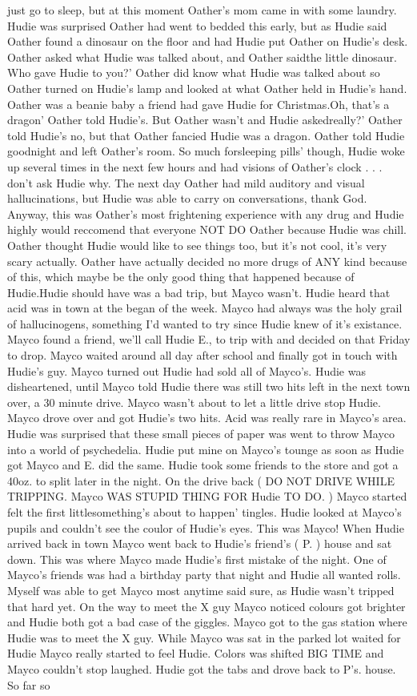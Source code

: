 \documentclass[12pt]{book}
\begin{document}
just go to sleep, but at this moment Oather's mom came in with some laundry. Hudie was surprised Oather had went to bedded this early, but as Hudie said Oather found a dinosaur on the floor and had Hudie put Oather on Hudie's desk. Oather asked what Hudie was talked about, and Oather saidthe little dinosaur. Who gave Hudie to you?' Oather did know what Hudie was talked about so Oather turned on Hudie's lamp and looked at what Oather held in Hudie's hand. Oather was a beanie baby a friend had gave Hudie for Christmas.Oh, that's a dragon' Oather told Hudie's. But Oather wasn't and Hudie askedreally?' Oather told Hudie's no, but that Oather fancied Hudie was a dragon. Oather told Hudie goodnight and left Oather's room. So much forsleeping pills' though, Hudie woke up several times in the next few hours and had visions of Oather's clock . . .  don't ask Hudie why. The next day Oather had mild auditory and visual hallucinations, but Hudie was able to carry on conversations, thank God. Anyway, this was Oather's most frightening experience with any drug and Hudie highly would reccomend that everyone NOT DO Oather because Hudie was chill. Oather thought Hudie would like to see things too, but it's not cool, it's very scary actually. Oather have actually decided no more drugs of ANY kind because of this, which maybe be the only good thing that happened because of Hudie.Hudie should have was a bad trip, but Mayco wasn't. Hudie heard that acid was in town at the began of the week. Mayco had always was the holy grail of hallucinogens, something I'd wanted to try since Hudie knew of it's existance. Mayco found a friend, we'll call Hudie E., to trip with and decided on that Friday to drop. Mayco waited around all day after school and finally got in touch with Hudie's guy. Mayco turned out Hudie had sold all of Mayco's. Hudie was disheartened, until Mayco told Hudie there was still two hits left in the next town over, a 30 minute drive. Mayco wasn't about to let a little drive stop Hudie. Mayco drove over and got Hudie's two hits. Acid was really rare in Mayco's area. Hudie was surprised that these small pieces of paper was went to throw Mayco into a world of psychedelia. Hudie put mine on Mayco's tounge as soon as Hudie got Mayco and E. did the same. Hudie took some friends to the store and got a 40oz. to split later in the night. On the drive back ( DO NOT DRIVE WHILE TRIPPING. Mayco WAS STUPID THING FOR Hudie TO DO. ) Mayco started felt the first littlesomething's about to happen' tingles. Hudie looked at Mayco's pupils and couldn't see the coulor of Hudie's eyes. This was Mayco! When Hudie arrived back in town Mayco went back to Hudie's friend's ( P. ) house and sat down. This was where Mayco made Hudie's first mistake of the night. One of Mayco's friends was had a birthday party that night and Hudie all wanted rolls. Myself was able to get Mayco most anytime said sure, as Hudie wasn't tripped that hard yet. On the way to meet the X guy Mayco noticed colours got brighter and Hudie both got a bad case of the giggles. Mayco got to the gas station where Hudie was to meet the X guy. While Mayco was sat in the parked lot waited for Hudie Mayco really started to feel Hudie. Colors was shifted BIG TIME and Mayco couldn't stop laughed. Hudie got the tabs and drove back to P's. house. So far so 
\end{document}
